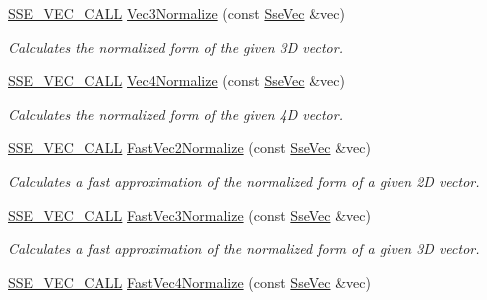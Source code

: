 \begin{DoxyCompactItemize}
\hyperlink{ssevec__math__defs_8h_a97454f977a5281455cecacce1e8ba670}{S\+S\+E\+\_\+\+V\+E\+C\+\_\+\+C\+A\+L\+L} \hyperlink{group___s_i_m_d_vec_math_gacaa2e633cd90a8081d82aa4d2ae55c4a}{Vec3\+Normalize} (const \hyperlink{namespacegfxmath_a0de2243e2b8d0fd46d3af5e036423004}{Sse\+Vec} \&vec)
\begin{DoxyCompactList}\small\item\em Calculates the normalized form of the given 3\+D vector. \end{DoxyCompactList}\item 
\hyperlink{ssevec__math__defs_8h_a97454f977a5281455cecacce1e8ba670}{S\+S\+E\+\_\+\+V\+E\+C\+\_\+\+C\+A\+L\+L} \hyperlink{group___s_i_m_d_vec_math_gac08655a161a0dfafb1e1c74398ac84bb}{Vec4\+Normalize} (const \hyperlink{namespacegfxmath_a0de2243e2b8d0fd46d3af5e036423004}{Sse\+Vec} \&vec)
\begin{DoxyCompactList}\small\item\em Calculates the normalized form of the given 4\+D vector. \end{DoxyCompactList}\item 
\hyperlink{ssevec__math__defs_8h_a97454f977a5281455cecacce1e8ba670}{S\+S\+E\+\_\+\+V\+E\+C\+\_\+\+C\+A\+L\+L} \hyperlink{group___s_i_m_d_vec_math_ga23748a5e8227b51330af5001eaaac478}{Fast\+Vec2\+Normalize} (const \hyperlink{namespacegfxmath_a0de2243e2b8d0fd46d3af5e036423004}{Sse\+Vec} \&vec)
\begin{DoxyCompactList}\small\item\em Calculates a fast approximation of the normalized form of a given 2\+D vector. \end{DoxyCompactList}\item 
\hyperlink{ssevec__math__defs_8h_a97454f977a5281455cecacce1e8ba670}{S\+S\+E\+\_\+\+V\+E\+C\+\_\+\+C\+A\+L\+L} \hyperlink{group___s_i_m_d_vec_math_ga33037e7ea8bc698c45ca3f7b3a8ff671}{Fast\+Vec3\+Normalize} (const \hyperlink{namespacegfxmath_a0de2243e2b8d0fd46d3af5e036423004}{Sse\+Vec} \&vec)
\begin{DoxyCompactList}\small\item\em Calculates a fast approximation of the normalized form of a given 3\+D vector. \end{DoxyCompactList}\item 
\hyperlink{ssevec__math__defs_8h_a97454f977a5281455cecacce1e8ba670}{S\+S\+E\+\_\+\+V\+E\+C\+\_\+\+C\+A\+L\+L} \hyperlink{group___s_i_m_d_vec_math_ga1c5d655ff8dfaebe8e8c99300a72dcfc}{Fast\+Vec4\+Normalize} (const \hyperlink{namespacegfxmath_a0de2243e2b8d0fd46d3af5e036423004}{Sse\+Vec} \&vec)

\end{DoxyCompactItemize}
